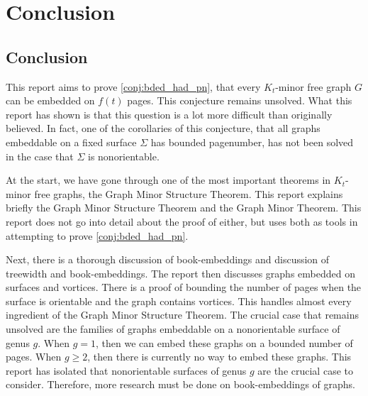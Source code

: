 \chapter{Conclusion}\label{chap:conclusion}



\section{Conclusion}
This report aims to prove \cref{conj:bded_had_pn}, that every $K_t$-minor free graph $G$ can be embedded on $f(t)$ pages. This conjecture remains unsolved. What this report has shown is that this question is a lot more difficult than originally believed. In fact, one of the corollaries of this conjecture, that all graphs embeddable on a fixed surface $\Sigma$ has bounded pagenumber, has not been solved in the case that $\Sigma$ is nonorientable. 

At the start, we have gone through one of the most important theorems in $K_t$-minor free graphs, the Graph Minor Structure Theorem. This report explains briefly the Graph Minor Structure Theorem and the Graph Minor Theorem. This report does not go into detail about the proof of either, but uses both as tools in attempting to prove \cref{conj:bded_had_pn}. 

Next, there is a thorough discussion of book-embeddings and discussion of treewidth and book-embeddings. The report then discusses graphs embedded on surfaces and vortices. There is a proof of bounding the number of pages when the surface is orientable and the graph contains vortices. This handles almost every ingredient of the Graph Minor Structure Theorem. The crucial case that remains unsolved are the families of graphs embeddable on a nonorientable surface of genus $g$. When $g = 1$, then we can embed these graphs on a bounded number of pages. When $g \geq 2$, then there is currently no way to embed these graphs. This report has isolated that nonorientable surfaces of genus $g$ are the crucial case to consider. Therefore, more research must be done on book-embeddings of graphs. 